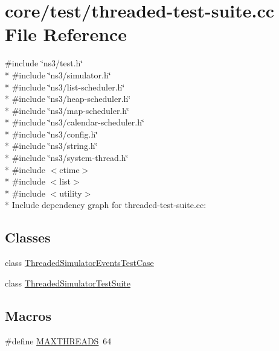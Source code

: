 \hypertarget{threaded-test-suite_8cc}{}\section{core/test/threaded-\/test-\/suite.cc File Reference}
\label{threaded-test-suite_8cc}
{\ttfamily \#include \char`\"{}ns3/test.\+h\char`\"{}}\\*
{\ttfamily \#include \char`\"{}ns3/simulator.\+h\char`\"{}}\\*
{\ttfamily \#include \char`\"{}ns3/list-\/scheduler.\+h\char`\"{}}\\*
{\ttfamily \#include \char`\"{}ns3/heap-\/scheduler.\+h\char`\"{}}\\*
{\ttfamily \#include \char`\"{}ns3/map-\/scheduler.\+h\char`\"{}}\\*
{\ttfamily \#include \char`\"{}ns3/calendar-\/scheduler.\+h\char`\"{}}\\*
{\ttfamily \#include \char`\"{}ns3/config.\+h\char`\"{}}\\*
{\ttfamily \#include \char`\"{}ns3/string.\+h\char`\"{}}\\*
{\ttfamily \#include \char`\"{}ns3/system-\/thread.\+h\char`\"{}}\\*
{\ttfamily \#include $<$ctime$>$}\\*
{\ttfamily \#include $<$list$>$}\\*
{\ttfamily \#include $<$utility$>$}\\*
Include dependency graph for threaded-\/test-\/suite.cc\+:
\subsection*{Classes}
\begin{DoxyCompactItemize}
\item 
class \hyperlink{classThreadedSimulatorEventsTestCase}{Threaded\+Simulator\+Events\+Test\+Case}
\item 
class \hyperlink{classThreadedSimulatorTestSuite}{Threaded\+Simulator\+Test\+Suite}
\end{DoxyCompactItemize}
\subsection*{Macros}
\begin{DoxyCompactItemize}
\item 
\#define \hyperlink{threaded-test-suite_8cc_ab9eade334fd8a98c128802aec7e9191c}{M\+A\+X\+T\+H\+R\+E\+A\+DS}~64
\end{DoxyCompactItemize}
